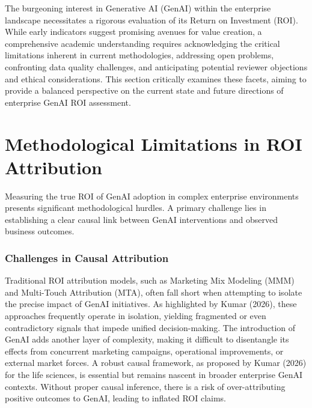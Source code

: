 \documentclass[10pt,journal,compsoc,twocolumn]{IEEEtran}
\begin{document}
The burgeoning interest in Generative AI (GenAI) within the enterprise landscape necessitates a rigorous evaluation of its Return on Investment (ROI). While early indicators suggest promising avenues for value creation, a comprehensive academic understanding requires acknowledging the critical limitations inherent in current methodologies, addressing open problems, confronting data quality challenges, and anticipating potential reviewer objections and ethical considerations. This section critically examines these facets, aiming to provide a balanced perspective on the current state and future directions of enterprise GenAI ROI assessment.


\section{Methodological Limitations in ROI Attribution}


Measuring the true ROI of GenAI adoption in complex enterprise environments presents significant methodological hurdles. A primary challenge lies in establishing a clear causal link between GenAI interventions and observed business outcomes.


\subsubsection{Challenges in Causal Attribution}

Traditional ROI attribution models, such as Marketing Mix Modeling (MMM) and Multi-Touch Attribution (MTA), often fall short when attempting to isolate the precise impact of GenAI initiatives. As highlighted by Kumar (2026), these approaches frequently operate in isolation, yielding fragmented or even contradictory signals that impede unified decision-making. The introduction of GenAI adds another layer of complexity, making it difficult to disentangle its effects from concurrent marketing campaigns, operational improvements, or external market forces. A robust causal framework, as proposed by Kumar (2026) for the life sciences, is essential but remains nascent in broader enterprise GenAI contexts. Without proper causal inference, there is a risk of over-attributing positive outcomes to GenAI, leading to inflated ROI claims.
\end{document}
